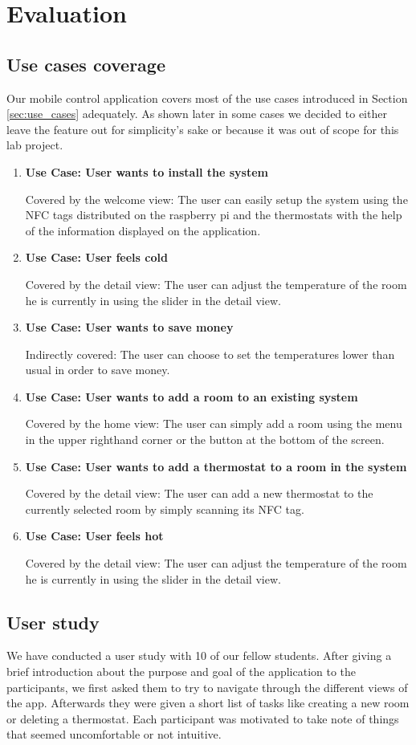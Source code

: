 \section{Evaluation}

\subsection {Use cases coverage}
Our mobile control application covers most of the use cases introduced in Section \ref{sec:use_cases} adequately. As shown later in some cases we decided to either leave the feature out for simplicity's sake or because it was out of scope for this lab project.

\begin{enumerate}
\item \textbf{Use Case: User wants to install the system}

Covered by the welcome view: The user can easily setup the system using the NFC tags distributed on the raspberry pi and the thermostats with the help of the information displayed on the application.
\item \textbf{Use Case: User feels cold}

Covered by the detail view: The user can adjust the temperature of the room he is currently in using the slider in the detail view.
\item \textbf{Use Case: User wants to save money}

Indirectly covered: The user can choose to set the temperatures lower than usual in order to save money.
\item \textbf{Use Case: User wants to add a room to an existing system}

Covered by the home view: The user can simply add a room using the menu in the upper righthand corner or the button at the bottom of the screen.
\item \textbf{Use Case: User wants to add a thermostat to a room in the system}

Covered by the detail view: The user can add a new thermostat to the currently selected room by simply scanning its NFC tag.
\item \textbf{Use Case: User feels hot}

Covered by the detail view: The user can adjust the temperature of the room he is currently in using the slider in the detail view.
\end{enumerate}

\subsection{User study}
We have conducted a user study with 10 of our fellow students. After giving a brief introduction about the purpose and goal of the application to the participants, we first asked them to try to navigate through the different views of the app. Afterwards they were given a short list of tasks like creating a new room or deleting a thermostat. Each participant was motivated to take note of things that seemed uncomfortable or not intuitive.

